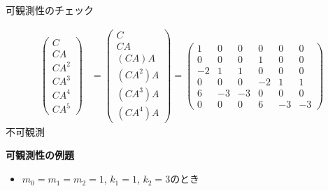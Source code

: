 \documentclass[a4paper,11pt,fleqn]{jreport}
\begin{document}
可観測性のチェック

\begin{align}
 \left(\begin{array}{l}
        C \\
        CA \\
        CA^2  \\
	CA^3 \\
	CA^4 \\
	CA^5
       \end{array}\right)
 &=
 \left(\begin{array}{l}
        C \\
        CA \\
        (CA)A  \\
	(CA^2)A \\
	(CA^3)A \\
	(CA^4)A
       \end{array}\right)
 =
 \left(\begin{array}{rrrrrr}
        1 & 0 & 0 & 0 & 0 & 0      \\
        0 & 0 & 0 & 1 & 0 & 0      \\
        -2& 1 & 1 & 0 & 0 & 0      \\
	0 & 0 & 0 & -2& 1 & 1 \\
	6 & -3& -3& 0 & 0 & 0 \\
	0 & 0 & 0 & 6 & -3& -3 
       \end{array}\right)
\nonumber
\end{align}
不可観測




\newpage
\noindent
{\bf 可観測性の例題}

\begin{itemize}
\item $m_0=m_1=m_2=1$, $k_1=1$, $k_2=3$のとき
\end{itemize}
\end{document}

